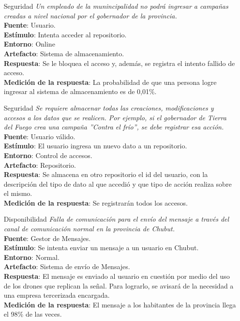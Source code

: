 \documentclass[a4paper, 11pt]{article}
\begin{document}
\begin{itemize}
\item[Seguridad] \textit{Un empleado de la munincipalidad no podrá ingresar a campa\~nas creadas a nivel nacional por el gobernador de la provincia.}\\
\textbf{Fuente}: Usuario.\\
\textbf{Estímulo}: Intenta acceder al repositorio. \\
\textbf{Entorno}: Online \\
\textbf{Artefacto}: Sistema de almacenamiento. \\
\textbf{Respuesta}: Se le bloquea el acceso y, además, se registra el intento fallido de acceso. \\
\textbf{Medición de la respuesta}: La probabilidad de que una persona logre ingresar al sistema de almacenamiento es de 0,01\%. \\

\item[Seguridad] \textit{Se requiere almacenar todas las creaciones, modificaciones y accesos a los datos que se realicen. Por ejemplo, si el gobernador de Tierra del Fuego crea una campa\~na ''Contra el frío'', se debe registrar esa acción. }\\
\textbf{Fuente}: Usuario válido.\\
\textbf{Estímulo}: El usuario ingresa un nuevo dato a un repositorio.\\
\textbf{Entorno}: Control de accesos.\\
\textbf{Artefacto}: Repositorio.\\
\textbf{Respuesta}: Se almacena en otro repositorio el id del usuario, con la descripción del tipo de dato al que accedió y que tipo de acción realiza sobre el mismo.\\
\textbf{Medición de la respuesta}: Se registrarán todos los accesos.\\

\item[Disponibilidad] \textit{Falla de comunicación para el envío del mensaje a través del canal de comunicación normal en la provincia de Chubut.}\\
\textbf{Fuente}: Gestor de Mensajes. \\
\textbf{Estímulo}: Se intenta enviar un mensaje a un usuario en Chubut. \\
\textbf{Entorno}: Normal. \\
\textbf{Artefacto}: Sistema de env\'io de Mensajes. \\
\textbf{Respuesta}: El mensaje es enviado al usuario en cuesti\'on por medio del uso de los drones que replican la se\~nal. Para lograrlo, se avisará de la necesidad a una empresa tercerizada encargada. \\
\textbf{Medición de la respuesta}: El mensaje a los habitantes de la provincia llega el 98\% de las veces. \\



\end{itemize}
\end{document}
